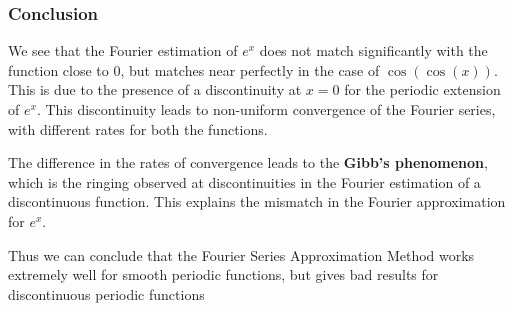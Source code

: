 \documentclass[11pt, a4paper, twoside]{article}
\begin{document}
\subsubsection{Conclusion}
    We see that the Fourier estimation of \(e^x\) does not match
significantly with the function close to \(0\), but matches near
perfectly in the case of \(\cos(\cos(x))\). This is due to the
presence of a discontinuity at \(x=0\) for the periodic extension of
\(e^x\). This discontinuity leads to non-uniform convergence of the
Fourier series, with different rates for both the functions.

The difference in the rates of convergence leads to the \textbf{Gibb's
phenomenon}, which is the ringing observed at discontinuities in the
Fourier estimation of a discontinuous function.
This explains the mismatch in the Fourier approximation for \(e^x\).

Thus we can conclude that the Fourier Series Approximation Method works extremely well
for smooth periodic functions, but gives bad results for discontinuous periodic functions
\end{document}
